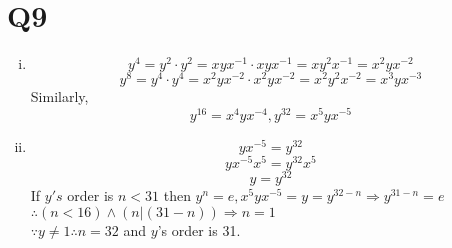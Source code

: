 \documentclass[12pt]{article}
\begin{document}
\section{Q9}
\begin{enumerate}[(i)]
\item $$y^4=y^2\cdot y^2=xyx^{-1}\cdot xyx^{-1}=xy^2x^{-1}=x^2yx^{-2}$$
$$y^8=y^4\cdot y^4=x^2yx^{-2}\cdot x^2yx^{-2}=x^2y^2x^{-2}=x^3yx^{-3}$$
Similarly, $$y^{16}=x^4yx^{-4},y^{32}=x^5yx^{-5}$$
\item $$yx^{-5}=y^{32}$$
$$yx^{-5}x^5=y^{32}x^5$$
$$y=y^{32}$$
If $y's$ order is $n<31$ then $y^n=e,x^5yx^{-5}=y=y^{32-n}\Rightarrow y^{31-n}=e$
\\$\therefore (n<16)\wedge(n|(31-n))\Rightarrow n=1$
\\$\because y\neq1\therefore n=32$ and $y$'s order is 31.
\end{enumerate}
\end{document}
